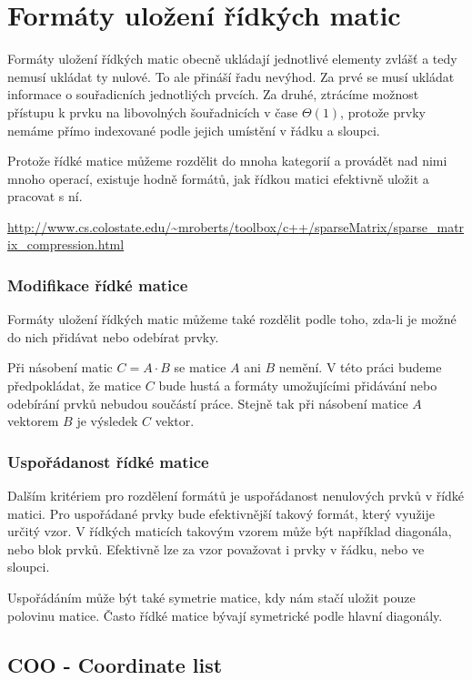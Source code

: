 \chapter{Formáty uložení řídkých matic}

Formáty uložení řídkých matic obecně ukládají jednotlivé elementy zvlášť a tedy nemusí ukládat ty nulové. To ale přináší řadu nevýhod. Za prvé se musí ukládat informace o souřadicních jednotliých prvcích. Za druhé, ztrácíme možnost přístupu k prvku na libovolných šouřadnicích v čase $\Theta(1)$, protože prvky nemáme přímo indexované podle jejich umístění v řádku a sloupci.

Protože řídké matice můžeme rozdělit do mnoha kategorií a provádět nad nimi mnoho operací, existuje hodně formátů, jak řídkou matici efektivně uložit a pracovat s ní.

\url{http://www.cs.colostate.edu/~mroberts/toolbox/c++/sparseMatrix/sparse_matrix_compression.html}

\subsection{Modifikace řídké matice}

Formáty uložení řídkých matic můžeme také rozdělit podle toho, zda-li je možné do nich přidávat nebo odebírat prvky.

Při násobení matic $C = A \cdot B$ se matice $A$ ani $B$ nemění. V této práci budeme předpokládat, že matice $C$ bude hustá a formáty umožujícími přidávání nebo odebírání prvků nebudou součástí práce. Stejně tak při násobení matice $A$ vektorem $B$ je výsledek $C$ vektor.

\subsection{Uspořádanost řídké matice}

Dalším kritériem pro rozdělení formátů je uspořádanost nenulových prvků v řídké matici. Pro uspořádané prvky bude efektivnější takový formát, který využije určitý vzor. V řídkých maticích takovým vzorem může být například diagonála, nebo blok prvků. Efektivně lze za vzor považovat i prvky v řádku, nebo ve sloupci.

Uspořádáním může být také symetrie matice, kdy nám stačí uložit pouze polovinu matice. Často řídké matice bývají symetrické podle hlavní diagonály.

\section{COO - Coordinate list}


